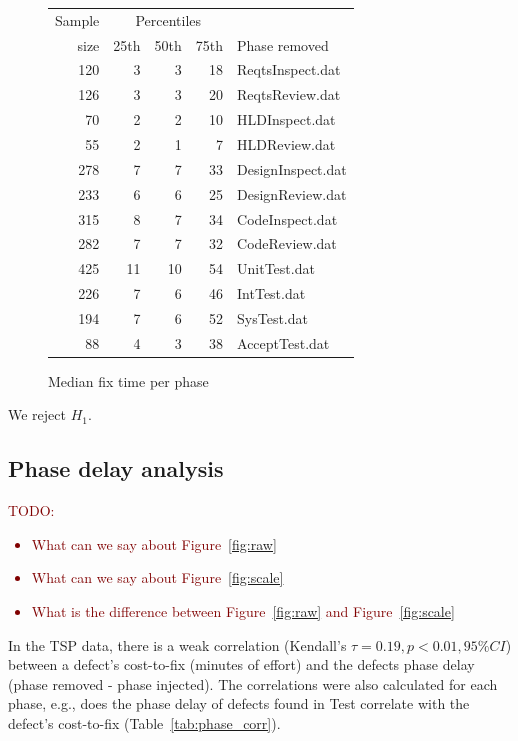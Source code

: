 \documentclass{sig-alternate}
\newcommand{\todo}[1]{\textcolor{Maroon}{TODO: #1}}
\newcommand{\bi}{\begin{itemize}[leftmargin=0.4cm]}
\newcommand{\ei}{\end{itemize}}
\newcommand{\fig}[1]{Figure~\ref{fig:#1}}
\begin{document}
\begin{figure}[!ht]
\begin{center}
\begin{tabular}{r|rrr|l}
  Sample&\multicolumn{3}{c|}{Percentiles}\\ 
size & 25th & 50th & 75th & Phase removed \\
\hline
120 & 3 & 3 & 18 & ReqtsInspect.dat \\
126 & 3 & 3 & 20 & ReqtsReview.dat \\
70 & 2 & 2 & 10 & HLDInspect.dat \\
 55 &    2 &    1&    7&HLDReview.dat \\

278&    7&    7&   33&DesignInspect.dat \\
233&    6&    6&   25&DesignReview.dat \\

315&    8&    7&   34&CodeInspect.dat \\ 
282&    7&    7&   32&CodeReview.dat\\ 

425&   11&   10&   54&UnitTest.dat \\ 
226&    7&    6&   46&IntTest.dat \\ 
194&    7&    6&   52&SysTest.dat\\ 
 88&    4&    3&   38&AcceptTest.dat\\
\end{tabular}
\end{center}
\caption{Median fix time per phase}
\label{fig:fix-time-per-phase}
\end{figure}

We reject $H_1$.

\subsection{Phase delay analysis}
\todo{
\bi
    \item What can we say about \fig{raw}
    \item What can we say about \fig{scale}
    \item What is the difference between \fig{raw} and \fig{scale}
\ei
}

In the TSP data, there is a weak correlation (Kendall's $\tau = 0.19, p < 0.01, 95\% CI$) between a defect's cost-to-fix (minutes of effort) and the defects phase delay (phase removed - phase injected). The correlations were also calculated for each phase, e.g., does the phase delay of defects found in Test correlate with the defect's cost-to-fix (Table~\ref{tab:phase_corr}). 
\end{document}
